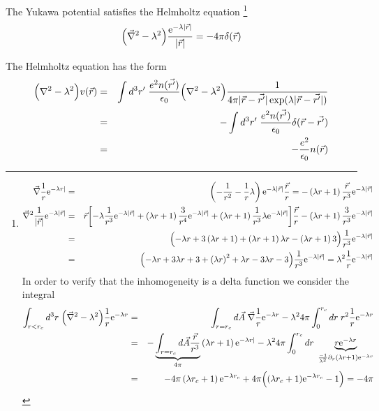 \documentclass[11pt,a4paper]{report}
\begin{document}
The Yukawa potential satisfies the Helmholtz equation
\footnote{
\begin{eqnarray}
\vec{\nabla}\frac{1}{r}\mathrm{e}^{-\lambda r|}
&=&\left(-\frac{1}{r^2}-\frac{1}{r}\lambda\right)\mathrm{e}^{-\lambda|\vec{r}|}
\frac{\vec{r}}{r}
=-\left(\lambda r+1\right)\frac{\vec{r}}{r^3}\mathrm{e}^{-\lambda|\vec{r}|}
\nonumber\\
\vec{\nabla}^2\frac{1}{|\vec{r}|}\mathrm{e}^{-\lambda|\vec{r}|}
&=&
\vec{r}\biggl[
-\lambda\frac{1}{r^3}\mathrm{e}^{-\lambda|\vec{r}|}
+\left(\lambda r+1\right)\frac{3}{r^4}\mathrm{e}^{-\lambda|\vec{r}|}
+\left(\lambda r+1\right)\frac{1}{r^3}\lambda\mathrm{e}^{-\lambda|\vec{r}|}
\biggr]\frac{\vec{r}}{r}
-\left(\lambda r+1\right)\frac{3}{r^3}\mathrm{e}^{-\lambda|\vec{r}|}
\nonumber\\
&=&
\Bigl(
-\lambda r
+3\left(\lambda r+1\right)
+\left(\lambda r+1\right)\lambda r
-\left(\lambda r+1\right)3
\Bigr)
\frac{1}{r^3}\mathrm{e}^{-\lambda|\vec{r}|}
\nonumber\\
&=&
\Bigl(
-\lambda r
+3\lambda r+3
+\left(\lambda r\right)^2+\lambda r
-3\lambda r-3
\Bigr)
\frac{1}{r^3}\mathrm{e}^{-\lambda|\vec{r}|}
=\lambda^2\frac{1}{r}\mathrm{e}^{-\lambda|\vec{r}|}
\nonumber\\
\end{eqnarray}
In order to verify that the inhomogeneity is a delta function we
consider the integral
\begin{eqnarray}
\int_{r<r_c} d^3r\;\Bigl(\vec{\nabla}^2-\lambda^2\Bigr)
\frac{1}{r}\mathrm{e}^{-\lambda r}&=&
\int_{r=r_c} d\vec{A}\;\vec{\nabla}\frac{1}{r}\mathrm{e}^{-\lambda r}
-\lambda^2 4\pi\int_0^{r_c}dr\; r^2\frac{1}{r}\mathrm{e}^{-\lambda r}
\nonumber\\
&=&
-\underbrace{\int_{r=r_c} d\vec{A}\frac{\vec{r}}{r^3}}_{4\pi}
\left(\lambda r+1\right)\mathrm{e}^{-\lambda r|}
-\lambda^2 4\pi\int_0^{r_c}dr\; 
\underbrace{r\mathrm{e}^{-\lambda r}
}_{\frac{-1}{\lambda^2}\partial_r (\lambda r+1)\mathrm{e}^{-\lambda r}}
\nonumber\\
&=&
-4\pi 
\left(\lambda r_c+1\right)\mathrm{e}^{-\lambda r_c}
+4\pi \Bigl((\lambda r_c+1)\mathrm{e}^{-\lambda r_c}-1\Bigr)=-4\pi
\end{eqnarray}
}
\begin{eqnarray}
\Bigl(\vec{\nabla}^2-\lambda^2\Bigr)
\frac{\mathrm{e}^{-\lambda|\vec{r}|}}{|\vec{r}|}=-4\pi\delta(\vec{r})
\end{eqnarray}

The Helmholtz equation has the form
\begin{eqnarray}
\Bigl(\nabla^2 -\lambda^2\Bigr)v(\vec{r})&=&
\int d^3r'\; 
\frac{e^2 n(\vec{r'})}{\epsilon_0}
\Bigl(\nabla^2 -\lambda^2\Bigr)
\frac{1}{4\pi|\vec{r}-\vec{r'}|\exp(\lambda|\vec{r}-\vec{r'}|)}
\nonumber\\
%
&=&-\int d^3r'\; 
\frac{e^2 n(\vec{r'})}{\epsilon_0}
\delta(\vec{r}-\vec{r'})
\nonumber\\
&=&-\frac{e^2 }{\epsilon_0}n(\vec{r})
\end{eqnarray}
\end{document}
